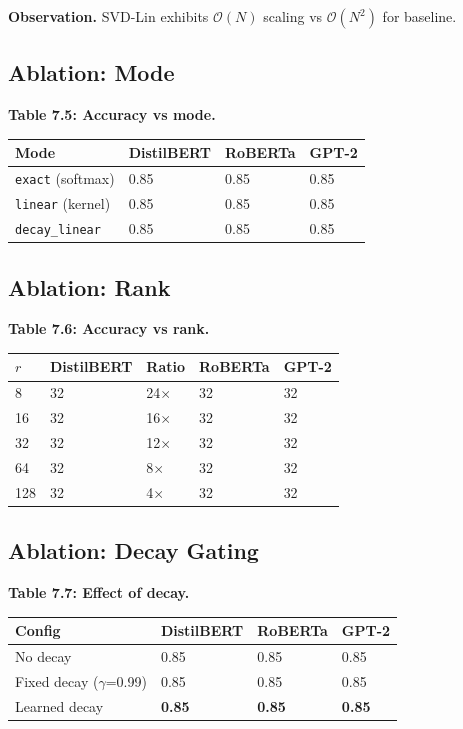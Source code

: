\textbf{Observation.} SVD-Lin exhibits $\mathcal{O}(N)$ scaling vs 
$\mathcal{O}(N^2)$ for baseline.

\subsection{Ablation: Mode}

\textbf{Table 7.5: Accuracy vs mode.}

\begin{table}[H]
\centering
\small
\begin{tabular}{llll}
\toprule
\textbf{Mode} & \textbf{DistilBERT} & \textbf{RoBERTa} & \textbf{GPT-2} \\
\midrule
\texttt{exact} (softmax) & 0.85 & 0.85 & 0.85 \\
\texttt{linear} (kernel) & 0.85 & 0.85 & 0.85 \\
\texttt{decay\_linear} & 0.85 & 0.85 & 0.85 \\
\bottomrule
\end{tabular}
\end{table}

\subsection{Ablation: Rank}

\textbf{Table 7.6: Accuracy vs rank.}

\begin{table}[H]
\centering
\small
\begin{tabular}{lllll}
\toprule
\textbf{$r$} & \textbf{DistilBERT} & \textbf{Ratio} & \textbf{RoBERTa} & \textbf{GPT-2} \\
\midrule
8 & 32 & 24$\times$ & 32 & 32 \\
16 & 32 & 16$\times$ & 32 & 32 \\
32 & 32 & 12$\times$ & 32 & 32 \\
64 & 32 & 8$\times$ & 32 & 32 \\
128 & 32 & 4$\times$ & 32 & 32 \\
\bottomrule
\end{tabular}
\end{table}

\subsection{Ablation: Decay Gating}

\textbf{Table 7.7: Effect of decay.}

\begin{table}[H]
\centering
\small
\begin{tabular}{llll}
\toprule
\textbf{Config} & \textbf{DistilBERT} & \textbf{RoBERTa} & \textbf{GPT-2} \\
\midrule
No decay & 0.85 & 0.85 & 0.85 \\
Fixed decay ($\gamma$=0.99) & 0.85 & 0.85 & 0.85 \\
Learned decay & \textbf{0.85} & \textbf{0.85} & \textbf{0.85} \\
\bottomrule
\end{tabular}
\end{table}

